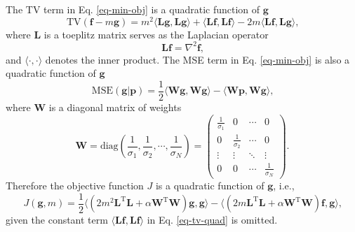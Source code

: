 \documentclass{article}
\newcommand{\vect}[1]{\mathbf{#1}}
\newcommand{\tv}{\mathrm{TV}}
\newcommand{\mse}[2]{\mathrm{MSE}\left(#1 \left| #2 \right. \right)}
\newcommand{\trans}[1]{\mathbf{#1}^\mathrm{T}}
\begin{document}
The TV term in Eq. \ref{eq-min-obj} is a quadratic function of $\vect{g}$
\begin{equation}
\tv(\vect{f} - m \vect{g}) = m^2 \langle \vect{L}\vect{g}, \vect{L}\vect{g}\rangle + \langle \vect{L}\vect{f}, \vect{L}\vect{f} \rangle - 2 m \langle \vect{L}\vect{f}, \vect{L}\vect{g}\rangle \text{,}
\label{eq-tv-quad}
\end{equation}
where $\vect{L}$ is a toeplitz matrix serves as the Laplacian operator
\begin{equation}
\vect{L} \vect{f} = \nabla^2 \vect{f}\text{,}
\end{equation}
and $\langle \cdot, \cdot \rangle$ denotes the inner product.
The MSE term in Eq. \ref{eq-min-obj} is also a quadratic function of $\vect{g}$
\begin{equation}
\mse{\vect{g}}{\vect{p}} = \frac{1}{2}\langle \vect{W}\vect{g}, \vect{W}\vect{g}\rangle - \langle \vect{W}\vect{p}, \vect{W}\vect{g} \rangle\text{,}
\end{equation}
where $\vect{W}$ is a diagonal matrix of weights
\begin{equation}
\vect{W} = \mathrm{diag}\left( \frac{1}{\sigma_1}, \frac{1}{\sigma_2}, \cdots, \frac{1}{\sigma_N} \right) = \begin{pmatrix}
  \frac{1}{\sigma_1} & 0 & \cdots & 0 \\
  0 & \frac{1}{\sigma_2} & \cdots & 0 \\
  \vdots & \vdots & \ddots & \vdots \\
  0 & 0 & \cdots & \frac{1}{\sigma_N}
\end{pmatrix}\text{.}
\end{equation}
Therefore the objective function $J$ is a quadratic function of $\vect{g}$, i.e.,
\begin{equation}
J(\vect{g},m) = \frac{1}{2}\langle \left( 2 m^2 \trans{L}\vect{L} + \alpha \trans{W}\vect{W} \right)\vect{g}, \vect{g}\rangle - \langle \left(2 m \trans{L}\vect{L} + \alpha\trans{W}\vect{W}\right) \vect{f}, \vect{g}\rangle\text{,}
\end{equation}
given the constant term $\langle \vect{L}\vect{f}, \vect{L}\vect{f} \rangle$ in Eq. \ref{eq-tv-quad} is omitted.
\end{document}

